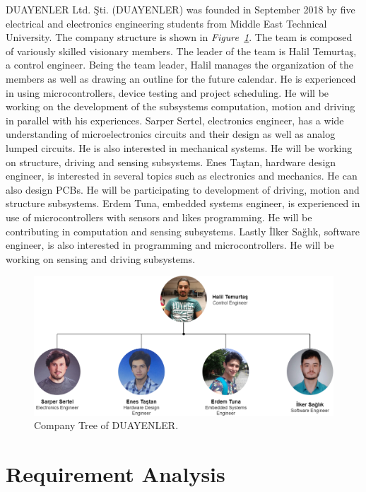 \documentclass[a4paper,12pt]{article}
\begin{document}
	DUAYENLER Ltd. Şti. (DUAYENLER) was founded in September 2018 by five electrical and electronics engineering students from Middle East Technical University. The company structure is shown in \textit{Figure~\ref{fig:company_tree}}. The team is composed of variously skilled visionary members. The leader of the team is Halil Temurtaş, a control engineer. Being the team leader, Halil manages the organization of the members as well as drawing an outline for the future calendar. He is experienced in using microcontrollers, device testing and project scheduling. He will be working on the development of the subsystems computation, motion and driving in parallel with his experiences. Sarper Sertel, electronics engineer, has a wide understanding of microelectronics circuits and their design as well as analog lumped circuits. He is also interested in mechanical systems. He will be working on structure, driving and sensing subsystems. Enes Taştan, hardware design engineer, is interested in several topics such as electronics and mechanics. He can also design PCBs. He will be participating to development of driving, motion and structure subsystems. Erdem Tuna, embedded systems engineer, is experienced in use of microcontrollers with sensors and likes programming. He will be contributing in computation and sensing subsystems. Lastly İlker Sağlık, software engineer, is also interested in programming and microcontrollers. He will be working on sensing and driving subsystems.

\begin{figure}[t!]
	\centering
	\includegraphics[width=\textwidth,height=\textheight,keepaspectratio]{../../Documents/company/company-tree} 
	\caption{\label{fig:company_tree}Company Tree of DUAYENLER.}
\end{figure}


\newpage

\section{Requirement Analysis}
	
\end{document}
